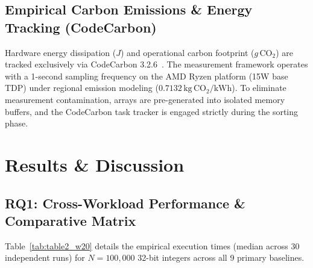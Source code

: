 \documentclass[journal]{IEEEtran}
\begin{document}
\subsection{Empirical Carbon Emissions \& Energy Tracking (CodeCarbon)}
Hardware energy dissipation ($J$) and operational carbon footprint ($g\,\text{CO}_2$) are tracked exclusively via CodeCarbon 3.2.6~\cite{schmidt2021codecarbon}. The measurement framework operates with a 1-second sampling frequency on the AMD Ryzen platform (15W base TDP) under regional emission modeling ($0.7132\,\text{kg}\,\text{CO}_2/\text{kWh}$). To eliminate measurement contamination, arrays are pre-generated into isolated memory buffers, and the CodeCarbon task tracker is engaged strictly during the sorting phase.

\section{Results \& Discussion}

\subsection{RQ1: Cross-Workload Performance \& Comparative Matrix}
Table~\ref{tab:table2_w20} details the empirical execution times (median across 30 independent runs) for $N = 100,000$ 32-bit integers across all 9 primary baselines.
\end{document}
